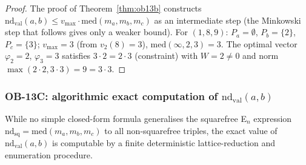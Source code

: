 \documentclass[12pt]{article}
\theoremstyle{definition}
\begin{document}
\begin{proof}
The proof of Theorem~\ref{thm:ob13b} constructs
$\mathrm{nd}_{\mathrm{val}}(a,b) \le v_{\max}\cdot\mathrm{med}(m_a,m_b,m_c)$ as an intermediate step
(the Minkowski step that follows gives only a weaker bound).
For $(1,8,9)$: $P_a=\emptyset$, $P_b=\{2\}$, $P_c=\{3\}$; $v_{\max}=3$ (from $v_2(8)=3$),
$\mathrm{med}(\infty,2,3)=3$.  The optimal vector $\varphi_2=2$, $\varphi_3=3$
satisfies $3\cdot2=2\cdot3$ (constraint) with $W=2\ne0$ and norm $\max(2\cdot2,3\cdot3)=9=3\cdot3$.
\end{proof}

\subsubsection*{OB-13C: algorithmic exact computation of
  $\mathrm{nd}_{\mathrm{val}}(a,b)$}

While no simple closed-form formula generalises the squarefree E$_n$ expression
$\mathrm{nd}_{\mathrm{sq}} = \mathrm{med}(m_a,m_b,m_c)$ to all non-squarefree triples,
the exact value of $\mathrm{nd}_{\mathrm{val}}(a,b)$ is computable by a finite
deterministic lattice-reduction and enumeration procedure.
\end{document}
